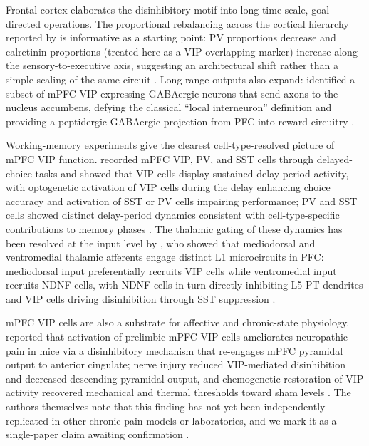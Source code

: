 \documentclass[11pt]{article}
\begin{document}
Frontal cortex elaborates the disinhibitory motif into long-time-scale, goal-directed operations. The proportional rebalancing across the cortical hierarchy reported by \citet{Torresgomez2020} is informative as a starting point: PV proportions decrease and calretinin proportions (treated here as a VIP-overlapping marker) increase along the sensory-to-executive axis, suggesting an architectural shift rather than a simple scaling of the same circuit \citep{Torresgomez2020}. Long-range outputs also expand: \citet{Lee2014b} identified a subset of mPFC VIP-expressing GABAergic neurons that send axons to the nucleus accumbens, defying the classical ``local interneuron'' definition and providing a peptidergic GABAergic projection from PFC into reward circuitry \citep{Lee2014b}.

Working-memory experiments give the clearest cell-type-resolved picture of mPFC VIP function. \citet{Kamigaki2017} recorded mPFC VIP, PV, and SST cells through delayed-choice tasks and showed that VIP cells display sustained delay-period activity, with optogenetic activation of VIP cells during the delay enhancing choice accuracy and activation of SST or PV cells impairing performance; PV and SST cells showed distinct delay-period dynamics consistent with cell-type-specific contributions to memory phases \citep{Kamigaki2017, Pi2013}. The thalamic gating of these dynamics has been resolved at the input level by \citet{Anastasiades2021a}, who showed that mediodorsal and ventromedial thalamic afferents engage distinct L1 microcircuits in PFC: mediodorsal input preferentially recruits VIP cells while ventromedial input recruits NDNF cells, with NDNF cells in turn directly inhibiting L5 PT dendrites and VIP cells driving disinhibition through SST suppression \citep{Anastasiades2021a}.

mPFC VIP cells are also a substrate for affective and chronic-state physiology. \citet{Li2022a} reported that activation of prelimbic mPFC VIP cells ameliorates neuropathic pain in mice via a disinhibitory mechanism that re-engages mPFC pyramidal output to anterior cingulate; nerve injury reduced VIP-mediated disinhibition and decreased descending pyramidal output, and chemogenetic restoration of VIP activity recovered mechanical and thermal thresholds toward sham levels \citep{Li2022a, Pi2013}. The authors themselves note that this finding has not yet been independently replicated in other chronic pain models or laboratories, and we mark it as a single-paper claim awaiting confirmation \citep{Li2022a}.
\end{document}
